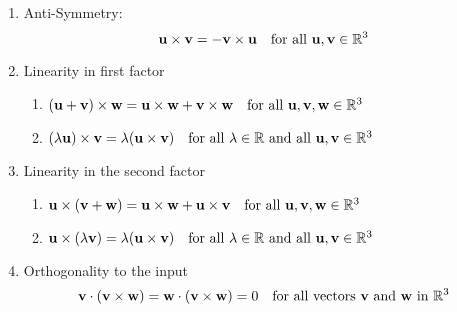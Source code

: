 \documentclass[10pt, a4paper]{article}
\newcommand{\mbf}[1]{\mathbf{#1}}
\begin{document}
\begin{proposition}
    \begin{enumerate}[label = (\roman*)]
        \item Anti-Symmetry:
        \[
        \mbf{u \times v = -v \times u}\quad\text{for all }\mbf{u, v} \in \R ^ 3
        \]
        \item Linearity in first factor
        \begin{enumerate}[label = (\arabic*)]
            \item $(\mbf{u + v}) \times \mbf{w} = \mbf{u \times w} + \mbf{v \times w}\quad\text{for all }\mbf{u, v, w} \in \R ^ 3$
            \item $(\lambda\mbf{u}) \times \mbf{v} = \lambda(\mbf{u \times v})\quad\text{for all } \lambda \in \R \text{ and all }\mbf{u, v} \in \R ^ 3$
        \end{enumerate}
        \item Linearity in the second factor
        \begin{enumerate}[label = (\arabic*)]
            \item $\mbf{u} \times (\mbf{v + w}) = \mbf{u \times w} + \mbf{u \times v}\quad\text{for all }\mbf{u, v, w} \in \R ^ 3$
            \item $\mbf{u} \times (\lambda\mbf{v}) = \lambda(\mbf{u \times v})\quad\text{for all } \lambda \in \R \text{ and all }\mbf{u, v} \in \R ^ 3$
        \end{enumerate}
        \item Orthogonality to the input
        \[
        \mbf{v} \cdot (\mbf{v \times w}) = \mbf{w} \cdot (\mbf{v \times w}) = 0\quad\text{for all vectors } \mbf{v} \text{ and } \mbf{w} \text{ in } \R ^ 3
        \]
    \end{enumerate}
\end{proposition}
\end{document}
